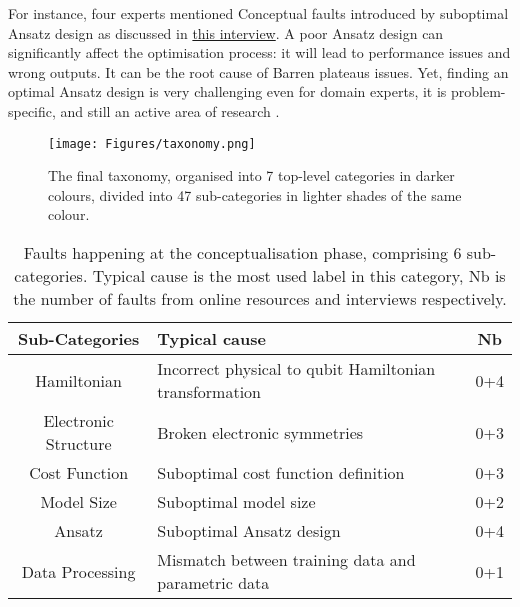 For instance, four experts mentioned Conceptual faults introduced by suboptimal Ansatz design as discussed in \href{https://anonymous.4open.science/r/A-Taxonomy-of-Real-Faults-in-Hybrid-Quantum-Classical-Architectures-EE25/Interviews/Pollished/Interview5_Pollished.docx}{this interview}. A poor Ansatz design can significantly affect the optimisation process: it will lead to performance issues and wrong outputs. It can be the root cause of Barren plateaus issues. Yet, finding an optimal Ansatz design is very challenging even for domain experts, it is problem-specific, and still an active area of research \cite{tilly_variational_2022}.


\begin{figure*}[hbt!]
    \centering
   \texttt{[image: Figures/taxonomy.png]}

   \caption{The final taxonomy, organised into 7 top-level categories in darker colours, divided into 47 sub-categories in lighter shades of the same colour.}
\label{FinalTax}
\end{figure*}


\begin{table}[hbt!]
    \centering
    \caption{Faults happening at the conceptualisation phase, comprising 6 sub-categories. Typical cause is the most used label in this category, Nb is the number of faults from online resources and interviews respectively.}
    \label{tab:conceptual}
    \begin{tabular}{@{}c|l|c}
         \textbf{Sub-Categories} & \textbf{Typical cause} & \textbf{Nb} \\
         \hline
      Hamiltonian & Incorrect physical to qubit Hamiltonian transformation & 0+4\\
      \hline
      Electronic Structure & Broken electronic symmetries & 0+3 \\
      \hline
        Cost Function & Suboptimal cost function definition & 0+3 \\
        \hline
        Model Size & Suboptimal model size &  0+2 \\
        \hline
        Ansatz & Suboptimal Ansatz design & 0+4 \\
        \hline
       Data Processing  &  Mismatch between training data and parametric data &  0+1 \\
    \end{tabular}
\end{table}

